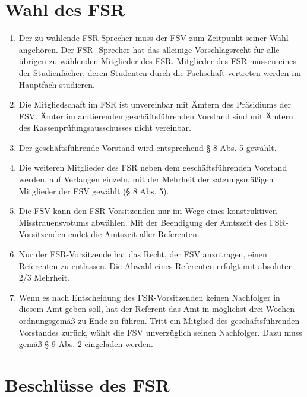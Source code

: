 \documentclass{article}
\begin{document}
\section{Wahl des FSR}\label{wahl-des-fsr}

\begin{enumerate}[(1)]
	\item Der zu wählende FSR-Sprecher muss der FSV zum Zeitpunkt seiner Wahl angehören. Der FSR- Sprecher hat das alleinige Vorschlagsrecht für alle übrigen zu wählenden Mitglieder des FSR. Mitglieder des FSR müssen eines der Studienfächer, deren Studenten durch die Fachschaft vertreten werden im Hauptfach studieren.
	\item Die Mitgliedschaft im FSR ist unvereinbar mit Ämtern des Präsidiums der FSV. Ämter im amtierenden geschäftsführenden Vorstand sind mit Ämtern des Kassenprüfungsausschusses nicht vereinbar.
	\item Der geschäftsführende Vorstand wird entsprechend § 8 Abs. 5 gewählt.
	\item Die weiteren Mitglieder des FSR neben dem geschäftsführenden Vorstand werden, auf Verlangen einzeln, mit der Mehrheit der satzungsmäßigen Mitglieder der FSV gewählt (§ 8 Abs. 5).
	\item Die FSV kann den FSR-Vorsitzenden nur im Wege eines konstruktiven Misstrauensvotums abwählen. Mit der Beendigung der Amtszeit des FSR-Vorsitzenden endet die Amtszeit aller Referenten.
	\item Nur der FSR-Vorsitzende hat das Recht, der FSV anzutragen, einen Referenten zu entlassen. Die Abwahl eines Referenten erfolgt mit absoluter 2/3 Mehrheit.
	\item Wenn es nach Entscheidung des FSR-Vorsitzenden keinen Nachfolger in diesem Amt geben soll, hat der Referent das Amt in möglichst drei Wochen ordnungsgemäß zu Ende zu führen. Tritt ein Mitglied des geschäftsführenden Vorstandes zurück, wählt die FSV unverzüglich seinen Nachfolger. Dazu muss gemäß § 9 Abs. 2 eingeladen werden.
\end{enumerate}

\section{Beschlüsse des FSR}\label{beschluxfcsse-des-fsr}
\end{document}
